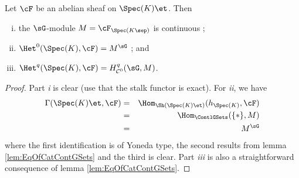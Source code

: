 \begin{cor}
Let $\cF$ be an abelian sheaf on $\Spec(K)\et$. Then
\begin{enumerate}[i.]
\item the $\sG$-module $M = \cF_{\Spec(K\sep)}$ is continuous ;
\item $\Het^0(\Spec(K), \cF)=M^{\sG}$ ; and
\item $\Het^q(\Spec(K), \cF) = H_{\mathcal{C}^0}^q(\sG, M)$.
\end{enumerate}
\end{cor}

\begin{proof}
Part {\it i} is clear (use that the stalk functor is exact). For {\it ii}, we have 
\begin{eqnarray*}
\Gamma(\Spec(K)\et, \cF) & = & \Hom_{\Sh(\Spec(K)\et)}(h_{\Spec(K)}, \cF) \\
& = & \Hom_{\ContlGSets}(\{*\}, M) \\
& = &  M^{\sG}
\end{eqnarray*}
where the first identification is of Yoneda type, the second results from lemma \ref{lem:EqOfCatContGSets} and the third is clear. Part {\it iii} is also a straightforward consequence of lemma \ref{lem:EqOfCatContGSets}.
\end{proof}

